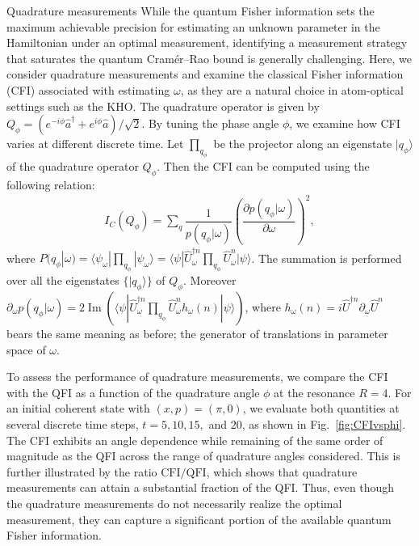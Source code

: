 \documentclass[amsmath,nobibnotes,aps,amssymb,pra, prl,aps,showpacs,superscriptaddress,twocolumn, longbibliography, reprint]{revtex4-2}
\begin{document}
\begin{section}{Quadrature measurements}
While the quantum Fisher information sets the maximum achievable precision for estimating an unknown parameter in the Hamiltonian under an optimal measurement, identifying a measurement strategy that saturates the quantum Cramér–Rao bound is generally challenging. Here, we consider quadrature measurements and examine the classical Fisher information (CFI) associated with estimating $\omega$, as they are a natural choice in atom-optical settings such as the KHO. The quadrature operator is given by $Q_\phi=\left(e^{-i\phi}\hat{a}^\dagger+e^{i\phi}\hat{a} \right)/\sqrt{2}$. By tuning the phase angle $\phi$, we examine how CFI varies at different discrete time. Let $\prod_{q_\phi}$ be the projector along an eigenstate $|q_\phi\rangle$ of the quadrature operator $Q_\phi$. Then the CFI can be computed using the following relation:
\begin{eqnarray}\label{CFI}
I_C(Q_\phi) =\sum_{q}\dfrac{1}{p(q_\phi|\omega)}\left(\dfrac{\partial p(q_\phi|\omega)}{\partial \omega} \right)^2, 
\end{eqnarray}
where $P(q_\phi|\omega)=\langle \psi_\omega|\prod_{q_\phi}|\psi_\omega\rangle=\langle \psi|\hat{U}_{\omega}^{\dagger n}\prod_{q_\phi}\hat{U}^{n}_{\omega}|\psi\rangle$. The summation is performed over all the eigenstates $\{|q_\phi\rangle\}$ of $Q_{\phi}$. Moreover $\partial_{\omega} p(q_\phi|\omega)=2\operatorname{Im}(\langle\psi|\hat{U}_{\omega}^{\dagger n}\prod_{q_\phi}\hat{U}^{n}_{\omega}h_{\omega}(n)|\psi\rangle)$, where $h_\omega(n) = i \hat{U}^{\dagger n}\partial_{\omega}\hat{U}^{n}$ bears the same meaning as before; the generator of translations in parameter space of $\omega$. 


To assess the performance of quadrature measurements, we compare the CFI with the QFI as a function of the quadrature angle $\phi$ at the resonance $R=4$. For an initial coherent state with $(x,p)=(\pi,0)$, we evaluate both quantities at several discrete time steps, $t=5,10,15,$ and $20$, as shown in Fig.~\ref{fig:CFIvsphi}. The CFI exhibits an angle dependence while remaining of the same order of magnitude as the QFI across the range of quadrature angles considered. This is further illustrated by the ratio $\mathrm{CFI}/\mathrm{QFI}$, which shows that quadrature measurements can attain a substantial fraction of the QFI. Thus, even though the quadrature measurements do not necessarily realize the optimal measurement, they can capture a significant portion of the available quantum Fisher information.




\end{section}
\end{document}
